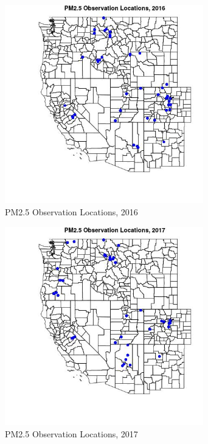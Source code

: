 \begin{figure} 
\centering  
\includegraphics[width=0.77\textwidth]{Code_Outputs/Report_PM25_Step4_part_e_de_duplicated_aves_ML_input_PlotLoc2016.jpg} 
\caption{\label{fig:Report_PM25_Step4_part_e_de_duplicated_aves_ML_inputPlotLoc2016}PM2.5 Observation Locations, 2016} 
\end{figure} 
 

\begin{figure} 
\centering  
\includegraphics[width=0.77\textwidth]{Code_Outputs/Report_PM25_Step4_part_e_de_duplicated_aves_ML_input_PlotLoc2017.jpg} 
\caption{\label{fig:Report_PM25_Step4_part_e_de_duplicated_aves_ML_inputPlotLoc2017}PM2.5 Observation Locations, 2017} 
\end{figure} 
 

